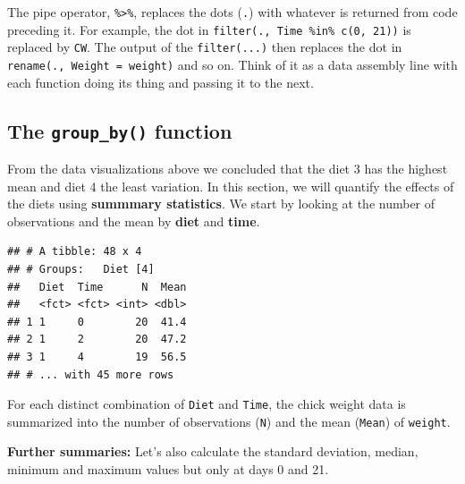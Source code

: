 \documentclass[]{book}
\newenvironment{Shaded}{\begin{snugshade}}{\end{snugshade}}
\newcommand{\DataTypeTok}[1]{\textcolor[rgb]{0.13,0.29,0.53}{#1}}
\newcommand{\KeywordTok}[1]{\textcolor[rgb]{0.13,0.29,0.53}{\textbf{#1}}}
\newcommand{\NormalTok}[1]{#1}
\newcommand{\OperatorTok}[1]{\textcolor[rgb]{0.81,0.36,0.00}{\textbf{#1}}}
\newcommand{\StringTok}[1]{\textcolor[rgb]{0.31,0.60,0.02}{#1}}
\theoremstyle{definition}
\theoremstyle{definition}
\theoremstyle{definition}
\theoremstyle{remark}
\begin{document}
The pipe operator, \texttt{\%\textgreater{}\%}, replaces the dots (\texttt{.}) with whatever is returned from code
preceding it. For example, the dot in \texttt{filter(.,\ Time\ \%in\%\ c(0,\ 21))} is replaced by
\texttt{CW}. The output of the \texttt{filter(...)} then replaces the dot in
\texttt{rename(.,\ Weight\ =\ weight)} and so on. Think of it as a data assembly line with
each function doing its thing and passing it to the next.

\hypertarget{the-group_by-function}{%
\subsection{\texorpdfstring{The \texttt{group\_by()} function}{The group\_by() function}}\label{the-group_by-function}}

From the data visualizations above we concluded that the diet 3 has the highest mean
and diet 4 the least variation. In this section, we will quantify the effects of the
diets using \textbf{summmary statistics}. We start by looking at the number of observations
and the mean by \textbf{diet} and \textbf{time}.

\begin{Shaded}
\end{Shaded}

\begin{verbatim}
## # A tibble: 48 x 4
## # Groups:   Diet [4]
##   Diet  Time      N  Mean
##   <fct> <fct> <int> <dbl>
## 1 1     0        20  41.4
## 2 1     2        20  47.2
## 3 1     4        19  56.5
## # ... with 45 more rows
\end{verbatim}

For each distinct combination of \texttt{Diet} and \texttt{Time}, the chick weight data is summarized
into the number of observations (\texttt{N}) and the mean (\texttt{Mean}) of \texttt{weight}.

\textbf{Further summaries:} Let's also calculate the standard deviation, median, minimum and maximum values but only
at days 0 and 21.
\end{document}
